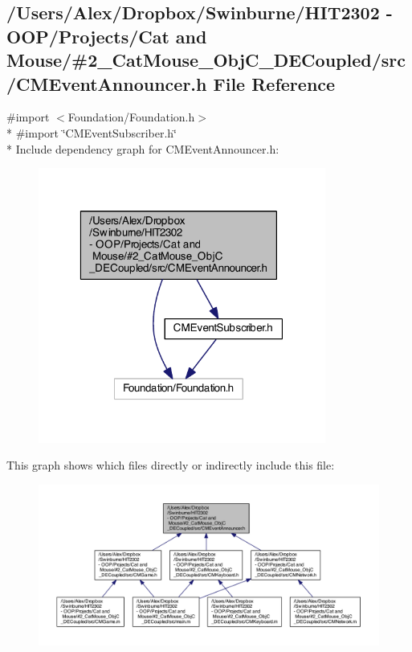 \subsection{/\-Users/\-Alex/\-Dropbox/\-Swinburne/\-H\-I\-T2302 -\/ O\-O\-P/\-Projects/\-Cat and Mouse/\#2\-\_\-\-Cat\-Mouse\-\_\-\-Obj\-C\-\_\-\-D\-E\-Coupled/src/\-C\-M\-Event\-Announcer.h File Reference}
\label{_c_m_event_announcer_8h}
{\ttfamily \#import $<$Foundation/\-Foundation.\-h$>$}\\*
{\ttfamily \#import \char`\"{}C\-M\-Event\-Subscriber.\-h\char`\"{}}\\*
Include dependency graph for C\-M\-Event\-Announcer.\-h\-:
\nopagebreak
\begin{figure}[H]
\begin{center}
\leavevmode
\includegraphics[width=268pt]{_c_m_event_announcer_8h__incl}
\end{center}
\end{figure}
This graph shows which files directly or indirectly include this file\-:
\nopagebreak
\begin{figure}[H]
\begin{center}
\leavevmode
\includegraphics[width=350pt]{_c_m_event_announcer_8h__dep__incl}
\end{center}
\end{figure}
